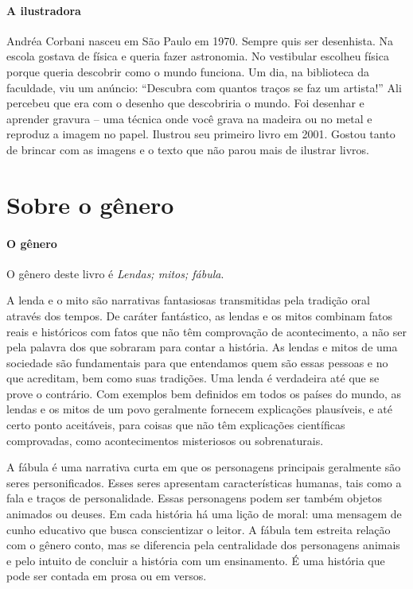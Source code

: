 \documentclass[11pt]{extarticle}
\begin{document}
\paragraph{A ilustradora} Andréa Corbani nasceu em São Paulo em 1970. Sempre
quis ser desenhista. Na escola gostava de física e queria fazer astronomia. No vestibular escolheu física porque queria descobrir como o mundo funciona. Um dia, na biblioteca
da faculdade, viu um anúncio: “Descubra com quantos traços se faz um artista!” Ali percebeu que era com o desenho que descobriria o mundo. Foi desenhar e aprender gravura – uma técnica onde você grava na madeira ou no metal e reproduz a imagem no papel. Ilustrou seu primeiro livro em 2001. Gostou tanto de brincar com as imagens e o texto que não parou mais de ilustrar livros.



\section{Sobre o gênero}

\paragraph{O gênero} O gênero deste livro é \textit{Lendas; mitos; fábula}. 

A lenda e o mito são narrativas fantasiosas transmitidas pela tradição oral através dos tempos. De caráter fantástico, as lendas e os mitos combinam fatos reais e históricos com fatos que não têm comprovação de acontecimento, a não ser pela palavra dos que sobraram para contar a história. As lendas e mitos de uma sociedade são fundamentais para que entendamos quem são essas pessoas e no que acreditam, bem como suas tradições. Uma lenda é verdadeira até que se prove o contrário. Com exemplos bem definidos em todos os países do mundo, as lendas e os mitos de um povo geralmente fornecem explicações plausíveis, e até certo ponto aceitáveis, para coisas que não têm explicações científicas comprovadas, como acontecimentos misteriosos ou sobrenaturais.

A fábula é uma narrativa curta em que os personagens principais geralmente são seres personificados. Esses seres apresentam características humanas, tais como a fala e traços de personalidade. Essas personagens podem ser também objetos animados ou deuses. Em cada história há uma lição de moral: uma mensagem de cunho educativo que busca conscientizar o leitor. A fábula tem estreita relação com o gênero conto, mas se diferencia pela centralidade dos personagens animais e pelo intuito de concluir a história com um ensinamento. É uma história que pode ser contada em prosa ou em versos. 
\end{document}
